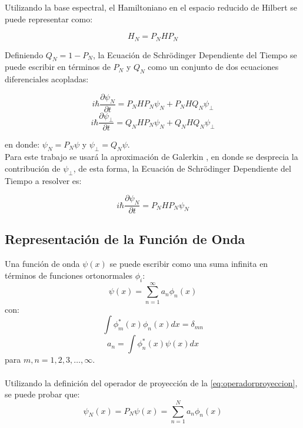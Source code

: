 Utilizando la base espectral, el Hamiltoniano en el espacio reducido de Hilbert se puede representar como:

\begin{equation}
  \label{eq:Hamiltonianored}
  H_N = P_NHP_N
\end{equation}

Definiendo $Q_N = 1-P_N$, la Ecuación de Schrödinger Dependiente del Tiempo se puede escribir en términos de $P_N$ y $Q_N$ como un conjunto de dos ecuaciones diferenciales acopladas:

\begin{equation}
  \label{eq:acopladas1}
  i\hbar\frac{\partial \psi_N}{\partial t} = P_NHP_N\psi_N + P_NHQ_N\psi_{\perp}
\end{equation}
\begin{equation}
  \label{eq:acopladas2}
  i\hbar\frac{\partial \psi_{\perp}}{\partial t} = Q_NHP_N\psi_N + Q_NHQ_N\psi_{\perp}
\end{equation}


en donde: $\psi_N = P_N\psi$ y $\psi_{\perp}=Q_N\psi$.
\\

Para este trabajo se usará la aproximación de Galerkin \cite{Gottlieb}, en donde se desprecia la contribución de $\psi_{\perp}$, de esta forma, la Ecuación de Schrödinger Dependiente del Tiempo a resolver es:
\begin{tcolorbox}[colback=CTtitle!5!white,colframe=CTtitle!85!white]%
\begin{equation}
\label{eq:TDSEN}
i\hbar \frac{\partial \psi_N}{\partial t} = P_NHP_N\psi_N
\end{equation}
\end{tcolorbox}

\subsection{Representación de la Función de Onda}

Una función de onda $\psi(x)$ se puede escribir como una suma infinita en términos de funciones ortonormales $\phi_i$:
\begin{equation}
  \label{eq:wavefuninf}
  \psi(x) = \sum_{n=1}^{\infty}a_n\phi_n(x)
\end{equation}
con:
\[ \int \phi_m^*(x)\phi_n(x)dx = \delta_{mn} \]
\[ a_n = \int \phi_n^*(x)\psi(x)dx\]
para $m,n=1,2,3,\dots, \infty$.
\\
\\
Utilizando la definición del operador de proyección de la \autoref{eq:operadorproyeccion}, se puede probar que:
\begin{equation}
  \label{eq:wavepacketinit}
  \psi_N(x) = P_N\psi(x)=\sum_{n=1}^{N}a_n\phi_n(x)
\end{equation}

